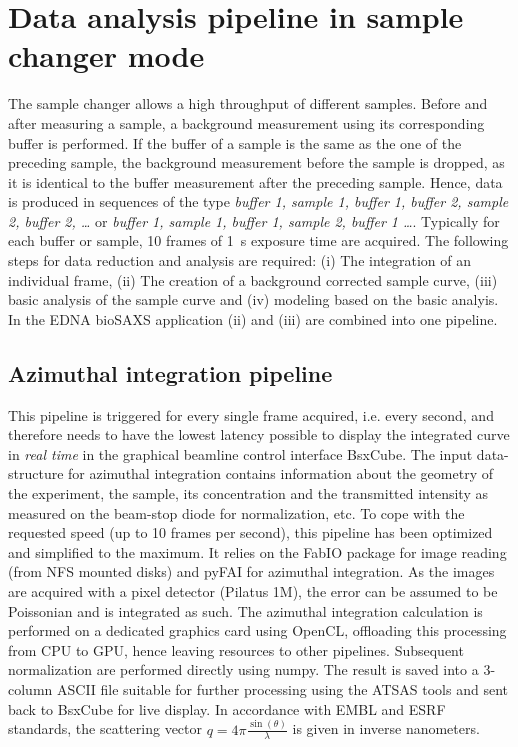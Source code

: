 \documentclass[preprint,pdf]{iucr}              %
\begin{document}
\section{Data analysis pipeline in sample changer mode}

The sample changer allows a high throughput of different samples. Before and after measuring a sample, a background measurement using its corresponding buffer is performed. If the buffer of a sample is the same as the one of the preceding sample, the background measurement before the sample is dropped, as it is identical to the buffer measurement after the preceding sample. Hence, data is produced in sequences of the type \textit{buffer 1, sample 1, buffer 1, buffer 2, sample 2, buffer 2, \ldots} or  \textit{buffer 1, sample 1, buffer 1,  sample 2, buffer 1 \ldots}. Typically for each buffer or sample, 10 frames of 1~s exposure time are acquired. The following steps for data reduction and analysis are required:
(i) The integration of an individual frame, (ii) The creation of a background corrected sample curve, (iii) basic analysis of the sample curve and (iv) modeling based on the basic analyis. In the EDNA bioSAXS application (ii) and (iii) are combined into one pipeline.

\subsection{Azimuthal integration pipeline}

This pipeline is triggered for every single frame acquired, i.e. every second,
and therefore needs to have the lowest latency possible to display the integrated curve
in \textit{real time} in the graphical beamline control  interface BsxCube.
The input data-structure for azimuthal integration contains 
information about the geometry of the experiment, the sample, its concentration
and the transmitted intensity as measured on the beam-stop diode for
normalization, etc.
To cope with the requested speed (up to 10 frames per second), this pipeline
has been optimized and simplified to the maximum. 
It relies on the FabIO\cite{fabio} package for image reading (from NFS mounted disks) and
pyFAI\cite{pyFAI} for azimuthal integration. 
As the images are acquired with a pixel detector (Pilatus 1M), the error can be
assumed to be Poissonian and is integrated as such. 
The azimuthal integration calculation is performed on a dedicated graphics card using OpenCL, offloading this processing from CPU to
GPU, hence leaving resources to other pipelines.  Subsequent normalization are performed directly using numpy\cite{numpy}.
The result is saved into a 3-column ASCII file suitable for further processing
using the ATSAS tools\cite{atsas} and sent back to BsxCube for live display. In accordance with EMBL and ESRF standards, the scattering vector $q=4\pi\frac{\sin(\theta)}{\lambda}$ is given in inverse nanometers.
\end{document}

